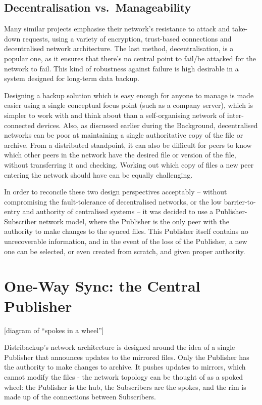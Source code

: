 \documentclass[12pt,a4paper,]{adreport}
\begin{document}
\subsection{Decentralisation
vs.~Manageability}\label{decentralisation-vs.manageability}

Many similar projects emphasise their network's resistance to attack and
take-down requests, using a variety of encryption, trust-based
connections and decentralised network architecture. The last method,
decentralisation, is a popular one, as it ensures that there's no
central point to fail/be attacked for the network to fail. This kind of
robustness against failure is high desirable in a system designed for
long-term data backup.

Designing a backup solution which is easy enough for anyone to manage is
made easier using a single conceptual focus point (such as a company
server), which is simpler to work with and think about than a
self-organising network of inter-connected devices. Also, as discussed
earlier during the Background, decentralised networks can be poor at
maintaining a single authoritative copy of the file or archive. From a
distributed standpoint, it can also be difficult for peers to know which
other peers in the network have the desired file or version of the file,
without transferring it and checking. Working out which copy of files a
new peer entering the network should have can be equally challenging.

In order to reconcile these two design perspectives acceptably --
without compromising the fault-tolerance of decentralised networks, or
the low barrier-to-entry and authority of centralised systems -- it was
decided to use a Publisher-Subscriber network model, where the Publisher
is the only peer with the authority to make changes to the synced files.
This Publisher itself contains no unrecoverable information, and in the
event of the loss of the Publisher, a new one can be selected, or even
created from scratch, and given proper authority.

\section{One-Way Sync: the Central
Publisher}\label{one-way-sync-the-central-publisher}

{[}diagram of ``spokes in a wheel''{]}

Distribackup's network architecture is designed around the idea of a
single Publisher that announces updates to the mirrored files. Only the
Publisher has the authority to make changes to archive. It pushes
updates to mirrors, which cannot modify the files - the network topology
can be thought of as a spoked wheel: the Publisher is the hub, the
Subscribers are the spokes, and the rim is made up of the connections
between Subscribers.
\end{document}
